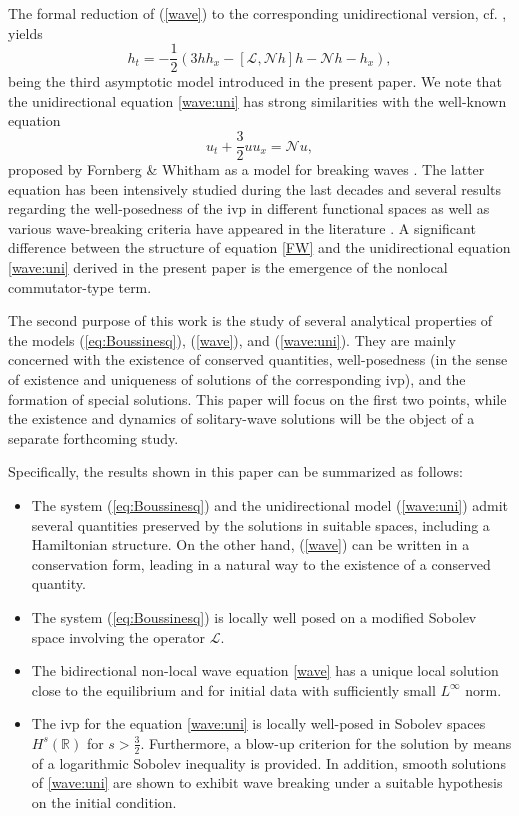 \documentclass[final,11pt,a4paper,reqno]{amsart}
\newcommand{\RR}{\mathbb R}
\theoremstyle{definition}
\begin{document}
The formal reduction of (\ref{wave}) to the corresponding unidirectional version, cf. \cite{Whitham74}, yields
\begin{equation}\label{wave:uni}
h_{t}=-\frac{1}{2}\left(3 hh_{x}-[\mathscr{L},\mathscr{N}h]h - \mathscr{N}h-h_{x} \right),
\end{equation}
being the third asymptotic model introduced in the present paper. We note that the
unidirectional equation \eqref{wave:uni} has strong similarities with the well-known equation
\begin{equation}\label{FW}
u_{t}+\frac{3}{2} uu_{x}= \mathscr{N}u,
\end{equation}
proposed by Fornberg \& Whitham as a model for breaking waves \cite{Fornberg-Whitham-78}. The latter equation has been intensively studied during the last decades and several results regarding the well-posedness of the ivp in different functional spaces as well as various wave-breaking criteria have appeared in the literature \cite{Itasaka-2021, Yang-2021, Haziot-2017, Hormann-2021,HolmesThompson-2017,Holmes-2016}. A significant difference between the structure of equation \eqref{FW} and the unidirectional equation \eqref{wave:uni} derived in the present paper is the emergence of the nonlocal commutator-type term. 

The second purpose of this work is the study of several analytical properties of the models (\ref{eq:Boussinesq}), (\ref{wave}), and (\ref{wave:uni}). They are mainly concerned with the existence of conserved quantities, well-posedness (in the sense of existence and uniqueness of solutions of the corresponding ivp), and the formation of special solutions. This paper will focus on the first two points, while the existence and dynamics of solitary-wave solutions will be the object of a separate forthcoming study.

Specifically, the results shown in this paper can be summarized as follows:
\begin{itemize}
\item The system (\ref{eq:Boussinesq}) and the unidirectional model (\ref{wave:uni}) admit several quantities preserved by the solutions in suitable spaces, including  a Hamiltonian structure. On the other hand, (\ref{wave}) can be written in a conservation form, leading in a natural way to the existence of a conserved quantity.
\item The system (\ref{eq:Boussinesq}) is locally well posed on a modified Sobolev space involving the operator $\mathscr{L}$.
\item The bidirectional non-local wave equation \eqref{wave} has a unique local solution close to the equilibrium and for initial data with sufficiently small $L^{\infty}$ norm.
\item The ivp for the equation \eqref{wave:uni} is locally well-posed in Sobolev spaces $H^{s}(\RR)$ for $s>\frac{3}{2}$. Furthermore, a blow-up criterion for the solution by means of a logarithmic Sobolev inequality is provided. In addition, smooth solutions of \eqref{wave:uni} are shown to exhibit  wave breaking under a suitable hypothesis on the initial condition.
\end{itemize}
\end{document}
